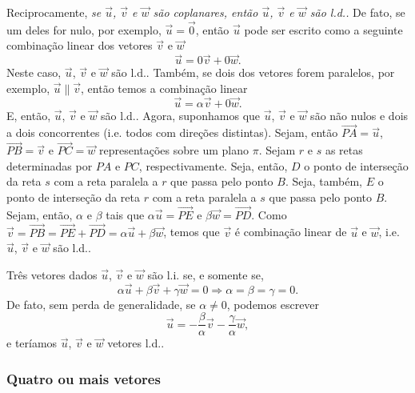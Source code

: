 Reciprocamente, \emph{se $\vec{u}$, $\vec{v}$ e $\vec{w}$ são coplanares, então $\vec{u}$, $\vec{v}$ e $\vec{w}$ são l.d..} De fato, se um deles for nulo, por exemplo, $\vec{u}=\vec{0}$, então $\vec{u}$ pode ser escrito como a seguinte combinação linear dos vetores $\vec{v}$ e $\vec{w}$
\begin{equation}
  \vec{u} = 0\vec{v} + 0\vec{w}.
\end{equation}
Neste caso, $\vec{u}$, $\vec{v}$ e $\vec{w}$ são l.d.. Também, se dois dos vetores forem paralelos, por exemplo, $\vec{u}\parallel\vec{v}$, então temos a combinação linear
\begin{equation}
  \vec{u} = \alpha\vec{v} + 0\vec{w}.
\end{equation}
E, então, $\vec{u}$, $\vec{v}$ e $\vec{w}$ são l.d.. Agora, suponhamos que $\vec{u}$, $\vec{v}$ e $\vec{w}$ são não nulos e dois a dois concorrentes (i.e. todos com direções distintas). Sejam, então $\overrightarrow{PA}=\vec{u}$, $\overrightarrow{PB}=\vec{v}$ e $\overrightarrow{PC}=\vec{w}$ representações sobre um plano $\pi$. Sejam $r$ e $s$ as retas determinadas por $PA$ e $PC$, respectivamente. Seja, então, $D$ o ponto de interseção da reta $s$ com a reta paralela a $r$ que passa pelo ponto $B$. Seja, também, $E$ o ponto de interseção da reta $r$ com a reta paralela a $s$ que passa pelo ponto $B$. Sejam, então, $\alpha$ e $\beta$ tais que $\alpha\vec{u}=\overrightarrow{PE}$ e $\beta\vec{w}=\overrightarrow{PD}$. Como $\vec{v} = \overrightarrow{PB} = \overrightarrow{PE} + \overrightarrow{PD} = \alpha\vec{u}+\beta\vec{w}$, temos que $\vec{v}$ é combinação linear de $\vec{u}$ e $\vec{w}$, i.e. $\vec{u}$, $\vec{v}$ e $\vec{w}$ são l.d..

\begin{obs}\label{obs:cbsc_li}
  Três vetores dados $\vec{u}$, $\vec{v}$ e $\vec{w}$ são l.i. se, e somente se, 
  \begin{equation}
    \alpha\vec{u} + \beta\vec{v} + \gamma\vec{w} = 0 \Rightarrow \alpha=\beta=\gamma = 0.
  \end{equation}
  De fato, sem perda de generalidade, se $\alpha\neq 0$, podemos escrever
  \begin{equation}
    \vec{u} = -\frac{\beta}{\alpha}\vec{v} - \frac{\gamma}{\alpha}\vec{w},
  \end{equation}
  e teríamos $\vec{u}$, $\vec{v}$ e $\vec{w}$ vetores l.d..
\end{obs}

\subsubsection{Quatro ou mais vetores}

